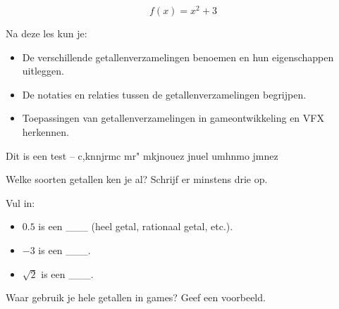 \documentclass{ximera}
\begin{document}


\begin{exercise}
    \[f(x)=x^2+3\]
\end{exercise}

Na deze les kun je:
\begin{itemize}
    \item De verschillende getallenverzamelingen benoemen en hun eigenschappen uitleggen.
    \item De notaties en relaties tussen de getallenverzamelingen begrijpen.
    \item Toepassingen van getallenverzamelingen in gameontwikkeling en VFX herkennen.
\end{itemize}
\begin{doelstelling}
    Dit is een test -- c,knnjrmc mr" mkjnouez jnuel umhnmo jmnez
\end{doelstelling}
\begin{exercise}
\begin{question}
Welke soorten getallen ken je al? Schrijf er minstens drie op.
\end{question}
\begin{question}
Vul in:
\begin{itemize}
    \item \( 0.5 \) is een \_\_\_ (heel getal, rationaal getal, etc.).
    \item \( -3 \) is een \_\_\_.
    \item \( \sqrt{2} \) is een \_\_\_.
\end{itemize}
\end{question}
\begin{question}
Waar gebruik je hele getallen in games? Geef een voorbeeld.
\end{question}
\end{exercise}

\end{document}

